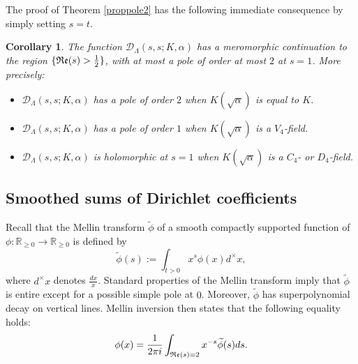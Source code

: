 \documentclass[10pt]{article}
\theoremstyle{plain}
\newtheorem{cor}[thm]{Corollary}
\theoremstyle{definition}
\theoremstyle{remark}
\renewcommand{\Re}{\frak{Re}}
\def\R{{\mathbb R}}
\def\cD{{\mathcal D}}
\begin{document}
The proof of Theorem \ref{proppole2} has the following immediate
consequence by simply setting $s=t$.

\begin{cor}\label{polesofZ}
The function $\cD_\Lambda(s,s;K,\alpha)$ has a meromorphic
continuation to the region $\{\Re(s)>\frac12\}$, with at most a pole of
order at most $2$ at $s=1$. More precisely:
\begin{itemize}
\item[{\rm (a)}] $\cD_\Lambda(s,s;K,\alpha)$ has a pole of order $2$
  when $K(\sqrt{\alpha})$ is equal to $K$.
\item[{\rm (b)}] $\cD_\Lambda(s,s;K,\alpha)$ has a pole of order $1$
  when $K(\sqrt{\alpha})$ is a $V_4$-field.
\item[{\rm (c)}] $\cD_\Lambda(s,s;K,\alpha)$ is holomorphic at $s=1$
  when $K(\sqrt{\alpha})$ is a $C_4$- or $D_4$-field.
\end{itemize}
\end{cor}



\subsection{Smoothed sums of Dirichlet coefficients}

Recall that the Mellin transform $\widetilde{\phi}$ of a smooth compactly supported
function of $\phi:\R_{\geq 0}\to\R_{\geq 0}$ is
defined by
\begin{equation*}
\widetilde{\phi}(s):=\int_{t>0}x^s\phi(x)d^\times x,
\end{equation*}
where $d^\times x$ denotes $\frac{dx}{x}$. Standard properties of the
Mellin transform imply that $\widetilde{\phi}$ is entire except for a
possible simple pole at $0$.  Moreover, $\widetilde{\phi}$ has
superpolynomial decay on vertical lines. Mellin inversion then states
that the following equality holds:
\begin{equation*}
\phi(x)=\frac{1}{2\pi i}\int_{\Re(s)=2}x^{-s}\widetilde{\phi}(s)ds.
\end{equation*}
\end{document}
